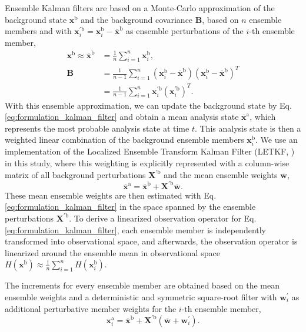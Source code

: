 \documentclass[hess, manuscript]{copernicus}
\begin{document}
Ensemble Kalman filters are based on a Monte-Carlo approximation of the background state $\mathbf{x}^\text{b}$ and the background covariance $\mathbf{B}$, based on $n$ ensemble members and with $\mathbf{x}^{\prime\text{b}}_{i}=\mathbf{x}^\text{b}_{i} - \overline{\mathbf{x}}^\text{b}$ as ensemble perturbations of the $i$-th ensemble member,
\begin{align}
	\mathbf{x}^\text{b} \approx \overline{\mathbf{x}}^\text{b} &=
	\frac{1}{n}\sum_{i=1}^{n} \mathbf{x}^\text{b}_{i},\label{eq:ens_approx_mean}\\
	\mathbf{B} &=
	\frac{1}{n-1}\sum_{i=1}^{n} (\mathbf{x}^\text{b}_{i} - \overline{\mathbf{x}}^\text{b})(\mathbf{x}^\text{b}_{i} - \overline{\mathbf{x}}^\text{b})^{T}\label{eq:ens_approx_cov}\\
	&= \frac{1}{n-1}\sum_{i=1}^{n} \mathbf{x}^{\prime\text{b}}_{i} (\mathbf{x}^{\prime\text{b}}_{i})^{T}.\nonumber
\end{align}
With this ensemble approximation, we can update the background state by Eq. \eqref{eq:formulation_kalman_filter} and obtain a mean analysis state $\overline{\mathbf{x}}^\text{a}$, which represents the most probable analysis state at time $t$.
This analysis state is then a weighted linear combination of the background ensemble members $\mathbf{x}^\text{b}_{i}$.
We use an implementation of the Localized Ensemble Transform Kalman Filter (LETKF, \citet{bishop_adaptive_2001,hunt_efficient_2007}) in this study, where this weighting is explicitly represented with a column-wise matrix of all background perturbations $\mathbf{X}^{\prime\text{b}}$ and the mean ensemble weights $\overline{\textbf{w}}$,
\begin{equation}
	\overline{\mathbf{x}}^\text{a} = \overline{\mathbf{x}}^\text{b} + \mathbf{X}^{\prime\text{b}} \overline{\mathbf{w}}.\label{eq:letkf_eq}
\end{equation}
These mean ensemble weights are then estimated with Eq. \eqref{eq:formulation_kalman_filter} in the space spanned by the ensemble perturbations $\mathbf{X}^{\prime\text{b}}$.
To derive a linearized observation operator for Eq. \eqref{eq:formulation_kalman_filter}, each ensemble member is independently transformed into observational space, and afterwards, the observation operator is linearized around the ensemble mean in observational space $H(\mathbf{x}^{\text{b}}) \approx \frac{1}{n}\sum_{i=1}^{n} H(\mathbf{x}^{\text{b}}_{i})$.

The increments for every ensemble member are obtained based on the mean ensemble weights and a deterministic and symmetric square-root filter with $\mathbf{w}^\prime_{i}$ as additional perturbative member weights for the $i$-th ensemble member,
\begin{equation*}
	\mathbf{x}^\text{a}_{i} = \overline{\mathbf{x}}^\text{b} + \mathbf{X}^{\prime\text{b}} (\overline{\mathbf{w}}+\mathbf{w}^\prime_{i}).
\end{equation*}
\end{document}

